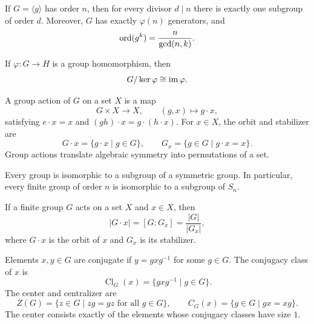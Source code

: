     \begin{proposition}
        If $G=\langle g\rangle$ has order $n$, then for every divisor $d\mid n$
        there is exactly one subgroup of order $d$. Moreover, $G$ has exactly
        $\varphi(n)$ generators, and
        \[
            \operatorname{ord}(g^k)=\frac{n}{\gcd(n,k)}.
        \]
    \end{proposition}

    \begin{theorem}
        If $\varphi\colon G\to H$ is a group homomorphism, then
        \[
            G/\ker\varphi\cong \operatorname{im}\varphi.
        \]
    \end{theorem}

    \begin{definition}
        A group action of $G$ on a set $X$ is a map
        \[
            G\times X\to X,
            \qquad
            (g,x)\mapsto g\cdot x,
        \]
        satisfying $e\cdot x=x$ and $(gh)\cdot x=g\cdot(h\cdot x)$. For
        $x\in X$, the orbit and stabilizer are
        \[
            G\cdot x=\{g\cdot x\mid g\in G\},
            \qquad
            G_x=\{g\in G\mid g\cdot x=x\}.
        \]
        Group actions translate algebraic symmetry into permutations of a set.
    \end{definition}

    \begin{theorem}
        Every group is isomorphic to a subgroup of a symmetric group. In
        particular, every finite group of order $n$ is isomorphic to a subgroup
        of $S_n$.
    \end{theorem}

    \begin{theorem}
        If a finite group $G$ acts on a set $X$ and $x\in X$, then
        \[
            |G\cdot x|
            =
            [G:G_x]
            =
            \frac{|G|}{|G_x|},
        \]
        where $G\cdot x$ is the orbit of $x$ and $G_x$ is its stabilizer.
    \end{theorem}

    \begin{definition}
        Elements $x,y\in G$ are conjugate if $y=gxg^{-1}$ for some $g\in G$.
        The conjugacy class of $x$ is
        \[
            \operatorname{Cl}_G(x)=\{gxg^{-1}\mid g\in G\}.
        \]
        The center and centralizer are
        \[
            Z(G)=\{z\in G\mid zg=gz\text{ for all }g\in G\},
            \qquad
            C_G(x)=\{g\in G\mid gx=xg\}.
        \]
        The center consists exactly of the elements whose conjugacy classes have
        size $1$.
    \end{definition}

